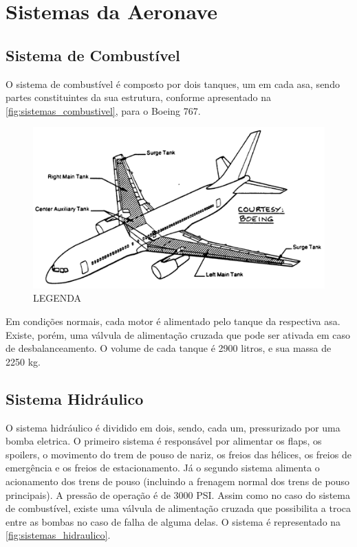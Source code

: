 \chapter{Sistemas da Aeronave}


\section{Sistema de Combustível}

O sistema de combustível é composto por dois tanques, um em cada asa, sendo partes constituintes da sua estrutura, conforme apresentado na \autoref{fig:sistemas_combustivel}, para o Boeing 767.

\begin{figure}
\centering
\includegraphics[width=\textwidth]{images/parte3/sistemas_combustivel.png}
\caption{LEGENDA}
\label{fig:sistemas_combustivel}
\end{figure}

Em condições normais, cada motor é alimentado pelo tanque da respectiva asa.
Existe, porém, uma válvula de alimentação cruzada que pode ser ativada em caso de desbalanceamento.
O volume de cada tanque é 2900 litros, e sua massa de 2250 kg.


\section{Sistema Hidráulico}

O sistema hidráulico é dividido em dois, sendo, cada um, pressurizado por uma bomba eletrica.
O primeiro sistema é responsável por alimentar os flaps, os spoilers, o movimento do trem de pouso de nariz, os freios das hélices, os freios de emergência e os freios de estacionamento.
Já o segundo sistema alimenta o acionamento dos trens de pouso (incluindo a frenagem normal dos trens de pouso principais).
A pressão de operação é de 3000 PSI.
Assim como no caso do sistema de combustível, existe uma válvula de alimentação cruzada que possibilita a troca entre as bombas no caso de falha de alguma delas.
O sistema é representado na \autoref{fig:sistemas_hidraulico}.

